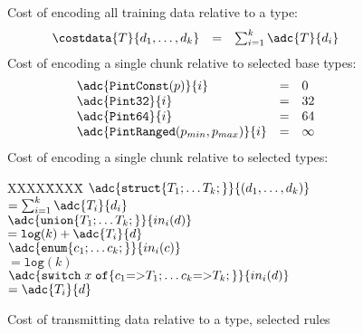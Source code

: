 \begin{figure}
{\small
Cost of encoding all training data relative to a type:
\[
\begin{array}{@{}lcl}
\costdata{T}{d_1,\ldots,d_k} &=& \sum_{i=1}^{k} \adc{T}{d_i} \\
\end{array}
\]
Cost of encoding a single chunk relative to selected base types:
\[
\begin{array}{@{}lcl}
\adc{\mathtt{PintConst}(p)}{i}      &=& 0 \\
\adc{\mathtt{Pint32}}{i}            &=& 32 \\
\adc{\mathtt{Pint64}}{i}            &=& 64 \\
\adc{\mathtt{PintRanged}(p_{min},p_{max})}{i} &=& \infty \\
\end{array}
\]
Cost of encoding a single chunk relative to selected types:

\begin{tabbing}
XXXX\=XXXX\=\+\kill
$\adc{\mathtt{struct \{} T_1;\ldots T_k; \mathtt{\}}}{(d_1,\ldots,d_k)}$ \\
  \> $= \sum_{i=1}^{k} \adc{T_i}{d_i}$ \\[1.5ex] 
$\adc{\mathtt{union \{} T_1;\ldots T_k; \mathtt{\}}}{in_i(d)}$ \\            
  \> $= \mathtt{log}(k) + \adc{T_i}{d}$ \\[1.5ex]
$\adc{\mathtt{enum \{} c_1;\ldots c_k; \mathtt{\}}}{in_i(c)}$ \\            
  \> $= \mathtt{log}(k)$ \vspace{3pt} \\[1.5ex]
$\adc{
\mathtt{switch}\; x \; 
  \mathtt{of \{} 
    c_1 \mathtt{=>} T_1; \ldots  
    c_k \mathtt{=>} T_k; 
  \mathtt{\}}
}{in_i(d)}$ \\ 
  \> $= \adc{T_i}{d}$ 
\end{tabbing}
}
\caption {Cost of transmitting data relative to a type, selected rules} \shrink
\label{fig:cost-data}
\end{figure}
